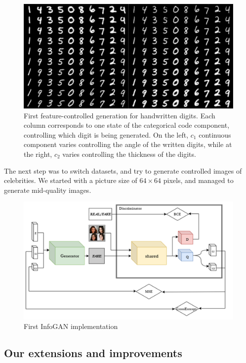 \documentclass{egpubl}
\begin{document}
\begin{figure}[!htb]
	\centering
	\includegraphics[width=1\linewidth]{pic/mnist}
	\caption{First feature-controlled generation for handwritten digits. Each column corresponds to one state of the categorical code component, controlling which digit is being generated. On the left, $c_1$ continuous component varies controlling the angle of the written digits, while at the right, $c_2$ varies controlling the thickness of the digits.}
	\label{fig:mnist_results}
\end{figure}

The next step was to switch datasets, and try to generate controlled images of celebrities. We started with a picture size of $64\times 64$ pixels, and managed to generate mid-quality images.

\begin{figure}[!htb]
	\centering
	\includegraphics[width=\linewidth]{pic/1}
	\caption{First InfoGAN implementation}
	\label{fig:infogan}
\end{figure}

\subsection{Our extensions and improvements}
\end{document}
